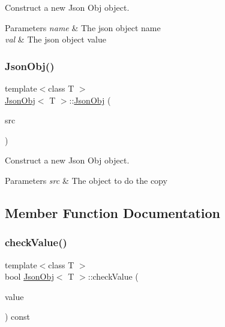 Construct a new Json Obj object. 


\begin{DoxyParams}{Parameters}
{\em name} & The json object name \\
\hline
{\em val} & The json object value \\
\hline
\end{DoxyParams}
\mbox{\label{class_json_obj_a74753a7e79120793f5b47a5257d5ffb2}} 
\subsubsection{\texorpdfstring{Json\+Obj()}{JsonObj()}\hspace{0.1cm}{\footnotesize\ttfamily [3/3]}}
{\footnotesize\ttfamily template$<$class T $>$ \\
\hyperlink{class_json_obj}{Json\+Obj}$<$ T $>$\+::\hyperlink{class_json_obj}{Json\+Obj} (\begin{DoxyParamCaption}\item[{\hyperlink{class_json_obj}{Json\+Obj}$<$ T $>$ const \&}]{src }\end{DoxyParamCaption})\hspace{0.3cm}{\ttfamily [inline]}}



Construct a new Json Obj object. 


\begin{DoxyParams}{Parameters}
{\em src} & The object to do the copy \\
\hline
\end{DoxyParams}


\subsection{Member Function Documentation}
\mbox{\label{class_json_obj_a42d298beda8a0b5ea4028f1cef533b0c}} 
\subsubsection{\texorpdfstring{check\+Value()}{checkValue()}}
{\footnotesize\ttfamily template$<$class T $>$ \\
bool \hyperlink{class_json_obj}{Json\+Obj}$<$ T $>$\+::check\+Value (\begin{DoxyParamCaption}\item[{T}]{value }\end{DoxyParamCaption}) const\hspace{0.3cm}{\ttfamily [inline]}}



